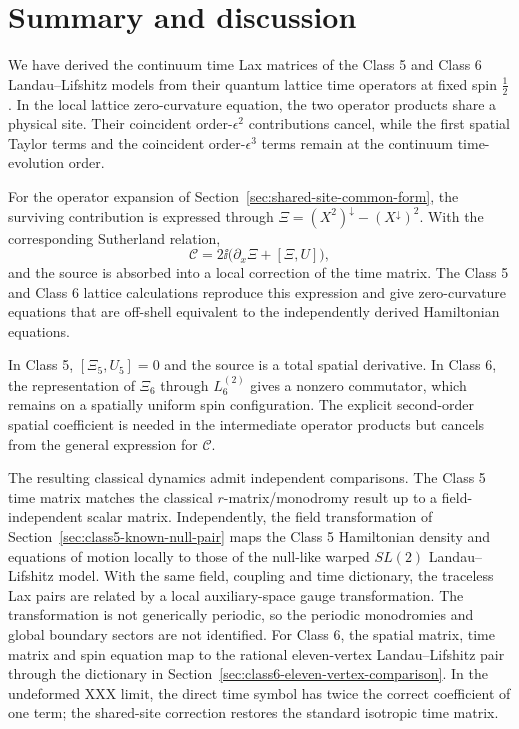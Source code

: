 \section{Summary and discussion}
\label{sec:summary-discussion}

We have derived the continuum time Lax matrices of the Class 5 and Class 6
Landau--Lifshitz models from their quantum lattice time operators at fixed
spin $\tfrac12$.  In the local lattice zero-curvature equation, the two
operator products share a physical site.  Their coincident
order-$\epsilon^2$ contributions cancel, while the first spatial Taylor terms
and the coincident order-$\epsilon^3$ terms remain at the continuum
time-evolution order.

For the operator expansion of Section~\ref{sec:shared-site-common-form}, the
surviving contribution is expressed through
$\Xi=(X^2)^\downarrow-(X^\downarrow)^2$.  With the corresponding Sutherland
relation,
\begin{equation}
\mathcal C=2\ii\bigl(\partial_x\Xi+[\Xi,U]\bigr),
\end{equation}
and the source is absorbed into a local correction of the time matrix.  The
Class 5 and Class 6 lattice calculations reproduce this expression and give
zero-curvature equations that are off-shell equivalent to the independently
derived Hamiltonian equations.

In Class 5, $[\Xi_5,U_5]=0$ and the source is a total spatial derivative.  In
Class 6, the representation of $\Xi_6$ through $L_6^{(2)}$ gives a nonzero
commutator, which remains on a spatially uniform spin configuration.  The
explicit second-order spatial coefficient is needed in the intermediate
operator products but cancels from the general expression for $\mathcal C$.

The resulting classical dynamics admit independent comparisons.  The Class 5
time matrix matches the classical $r$-matrix/monodromy result up to a
field-independent scalar matrix.  Independently, the field transformation of
Section~\ref{sec:class5-known-null-pair} maps the Class 5 Hamiltonian density
and equations of motion locally to those of the null-like warped $SL(2)$
Landau--Lifshitz model.  With the same field, coupling and time dictionary,
the traceless Lax pairs are related by a local auxiliary-space gauge
transformation.  The transformation is not generically periodic, so the
periodic monodromies and global boundary sectors are not identified.  For
Class 6, the spatial matrix, time matrix and spin equation map to the rational
eleven-vertex Landau--Lifshitz pair through the dictionary in
Section~\ref{sec:class6-eleven-vertex-comparison}.  In the undeformed XXX
limit, the direct time symbol has twice the correct coefficient of one term;
the shared-site correction restores the standard isotropic time matrix.


